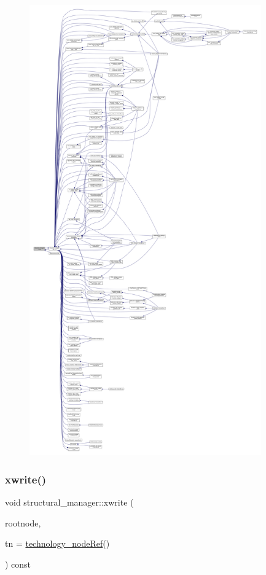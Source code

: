 \begin{figure}[H]
\begin{center}
\leavevmode
\includegraphics[height=550pt]{d7/d6b/classstructural__manager_a13ea548d745b21b07a8cca52a67bb7cf_icgraph}
\end{center}
\end{figure}
\mbox{\label{classstructural__manager_a1357e1db0d3895ee2fd084a109f242d7}} 
\subsubsection{\texorpdfstring{xwrite()}{xwrite()}}
{\footnotesize\ttfamily void structural\+\_\+manager\+::xwrite (\begin{DoxyParamCaption}\item[{\hyperlink{classxml__element}{xml\+\_\+element} $\ast$}]{rootnode,  }\item[{const \hyperlink{technology__node_8hpp_a33dd193b7bd6b987bf0d8a770a819fa7}{technology\+\_\+node\+Ref} \&}]{tn = {\ttfamily \hyperlink{technology__node_8hpp_a33dd193b7bd6b987bf0d8a770a819fa7}{technology\+\_\+node\+Ref}()} }\end{DoxyParamCaption}) const}



